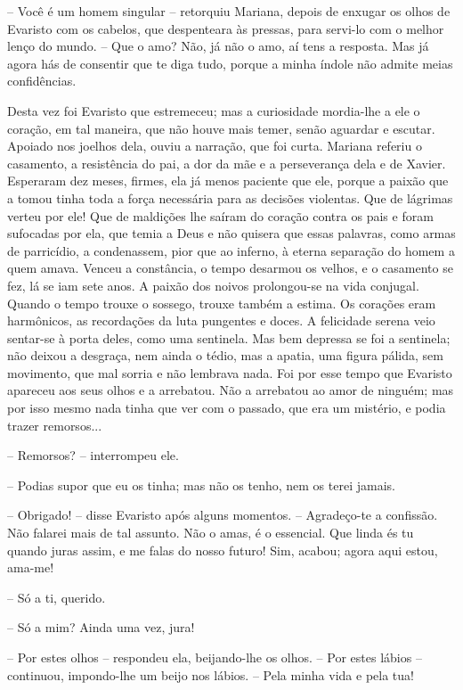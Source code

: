-- Você é um homem singular -- retorquiu Mariana, depois de enxugar os
olhos de Evaristo com os cabelos, que despenteara às pressas, para
servi-lo com o melhor lenço do mundo. -- Que o amo? Não, já não o amo,
aí tens a resposta. Mas já agora hás de consentir que te diga tudo,
porque a minha índole não admite meias confidências.

Desta vez foi Evaristo que estremeceu; mas a curiosidade mordia-lhe a
ele o coração, em tal maneira, que não houve mais temer, senão aguardar
e escutar. Apoiado nos joelhos dela, ouviu a narração, que foi curta.
Mariana referiu o casamento, a resistência do pai, a dor da mãe e a
perseverança dela e de Xavier. Esperaram dez meses, firmes, ela já menos
paciente que ele, porque a paixão que a tomou tinha toda a força
necessária para as decisões violentas. Que de lágrimas verteu por ele!
Que de maldições lhe saíram do coração contra os pais e foram sufocadas
por ela, que temia a Deus e não quisera que essas palavras, como armas
de parricídio, a condenassem, pior que ao inferno, à eterna separação do
homem a quem amava. Venceu a constância, o tempo desarmou os velhos, e o
casamento se fez, lá se iam sete anos. A paixão dos noivos prolongou-se
na vida conjugal. Quando o tempo trouxe o sossego, trouxe também a
estima. Os corações eram harmônicos, as recordações da luta pungentes e
doces. A felicidade serena veio sentar-se à porta deles, como uma
sentinela. Mas bem depressa se foi a sentinela; não deixou a desgraça,
nem ainda o tédio, mas a apatia, uma figura pálida, sem movimento, que
mal sorria e não lembrava nada. Foi por esse tempo que Evaristo apareceu
aos seus olhos e a arrebatou. Não a arrebatou ao amor de ninguém; mas
por isso mesmo nada tinha que ver com o passado, que era um mistério, e
podia trazer remorsos...

-- Remorsos? -- interrompeu ele.

-- Podias supor que eu os tinha; mas não os tenho, nem os terei jamais.

-- Obrigado! -- disse Evaristo após alguns momentos. -- Agradeço-te a
confissão. Não falarei mais de tal assunto. Não o amas, é o essencial.
Que linda és tu quando juras assim, e me falas do nosso futuro! Sim,
acabou; agora aqui estou, ama-me!

-- Só a ti, querido.

-- Só a mim? Ainda uma vez, jura!

-- Por estes olhos -- respondeu ela, beijando-lhe os olhos. -- Por estes
lábios -- continuou, impondo-lhe um beijo nos lábios. -- Pela minha vida
e pela tua!

